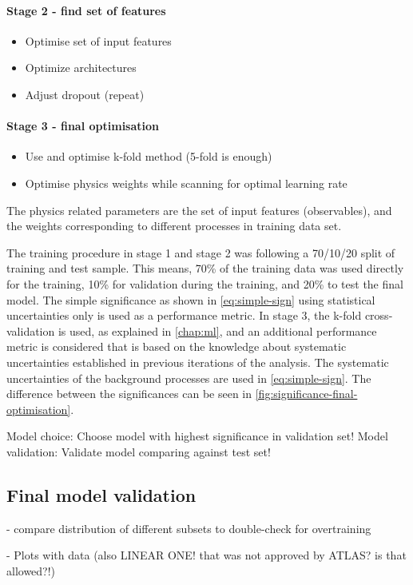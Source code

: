 \paragraph{Stage 2 - find set of features}
\begin{itemize}
    \item Optimise set of input features
    \item Optimize architectures
    \item Adjust dropout (repeat)
\end{itemize}

\paragraph{Stage 3 - final optimisation}
\begin{itemize}
    \item Use and optimise k-fold method (5-fold is enough)
    \item Optimise physics weights while scanning for optimal learning rate
\end{itemize}

The physics related parameters are the set of input features (observables), and the weights corresponding to different processes in training data set. 

The training procedure in stage 1 and stage 2 was following a 70/10/20 split of training and test sample. This means, 70\% of the training data was used directly for the training, 10\% for validation during the training, and 20\% to test the final model. The simple significance as shown in \cref{eq:simple-sign} using statistical uncertainties only is used as a performance metric.
In stage 3, the k-fold cross-validation is used, as explained in \cref{chap:ml}, and an additional performance metric is considered that is based on the knowledge about systematic uncertainties established in previous iterations of the analysis. The systematic uncertainties of the background processes are used in \cref{eq:simple-sign}. The difference between the significances can be seen in \cref{fig:significance-final-optimisation}.

Model choice: Choose model with highest significance in validation set!
Model validation: Validate model comparing against test set!




\subsection{Final model validation}

- compare distribution of different subsets to double-check for overtraining

- Plots with data (also LINEAR ONE! that was not approved by ATLAS? is that allowed?!)

